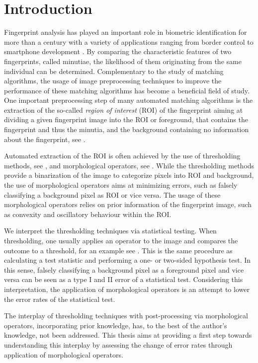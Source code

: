 \documentclass[a4paper,12pt]{article}
\theoremstyle{plain}
\theoremstyle{definition}
\begin{document}
\newpage



\section{Introduction}\label{section: introduction}

Fingerprint analysis has played an important role in biometric identification for more than a century with a variety of applications ranging from border control to smartphone development \cite{Henry}. By comparing the characteristic features of two fingerprints, called minutiae, the likelihood of them originating from the same individual can be determined. Complementary to the study of matching algorithms, the usage of image preprocessing techniques to improve the performance of these matching algorithms has become a beneficial field of study. One important preprocessing step of many automated matching algorithms is the extraction of the so-called \emph{region of interest} (ROI) of the fingerprint aiming at dividing a given fingerprint image into the ROI or foreground, that contains the fingerprint and thus the minutia, and the background containing no information about the fingerprint, see \cite{handbookfipri}.

Automated extraction of the ROI is often achieved by the use of thresholding methods, see \cite{FDB}, and morphological operators, see \cite{FDB, BazenGerez, adaboost}. While the thresholding methods provide a binarization of the image to categorize pixels into ROI and background, the use of morphological operators aims at minimizing errors, such as falsely classifying a background pixel as ROI or vice versa. The usage of these morphological operators relies on prior information of the fingerprint image, such as convexity and oscillatory behaviour within the ROI.

We interpret the thresholding techniques via statistical testing. When thresholding, one usually applies an operator to the image and compares the outcome to a threshold, for an example see \cite{AbramovichBenjamini1996}. This is the same procedure as calculating a test statistic and performing a one- or two-sided hypothesis test. In this sense, falsely classifying a background pixel as a foreground pixel and vice versa can be seen as a type I and II error of a statistical test. Considering this interpretation, the application of morphological operators is an attempt to lower the error rates of the statistical test.

The interplay of thresholding techniques with post-processing via morphological operators, incorporating prior knowledge, has, to the best of the author's knowledge, not been addressed. This thesis aims at providing a first step towards understanding this interplay by assessing the change of error rates through application of morphological operators.
\end{document}
